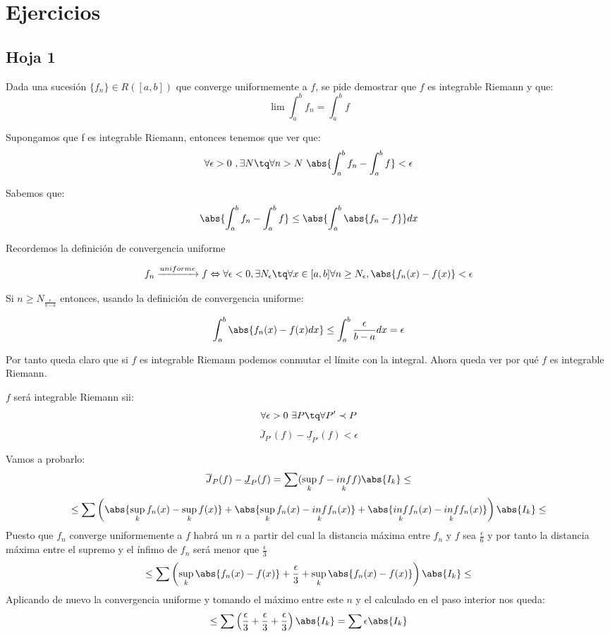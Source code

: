 \section{Ejercicios}
\subsection{Hoja 1}
\begin{problem}[5]
Dada una sucesión $\lbrace f_n \rbrace \in R([a,b])$ que converge uniformemente a $f$, se pide demostrar que $f$ es integrable Riemann y que:
\[ \lim \int_{a}^{b} f_n = \int_{a}^{b} f \]

\solution
Supongamos que f es integrable Riemann, entonces tenemos que ver que:
\[ \forall \epsilon > 0 \ , \exists N \tq \forall n> N \ \abs{\int_a^b f_n - \int_a^b f} < \epsilon\]

Sabemos que:
\[\abs{\int_a^b f_n - \int_a^b f} \leq \abs{\int_a^b \abs{f_n -f}} dx\]

Recordemos la definición de convergencia uniforme

\begin{defn}
\[f_n \xrightarrow{uniforme} f \Leftrightarrow \forall \epsilon < 0, \exists N_{\epsilon} \tq \forall x \in [a,b]  \forall n \geq N_{\epsilon}, \abs{f_n (x) - f(x)} < \epsilon\]
\end{defn}

Si $n \geq N_{\frac{\epsilon}{b-a}}$ entonces, usando la definición de convergencia uniforme:

\[\int_a^b \abs{f_n(x) - f(x) dx} \leq \int_a^b \frac{\epsilon}{b-a}dx = \epsilon\]

Por tanto queda claro que si $f$ es integrable Riemann podemos conmutar el límite con la integral. Ahora queda ver por qué $f$ es integrable Riemann.

$f$ será integrable Riemann sii:
\[\forall \epsilon > 0 \ \exists P \tq \forall P' \prec P \]
\[\overline{J}_{P'}(f) - \underline{J}_{P'}(f) < \epsilon\]

Vamos a probarlo:
\[\overline{J}_P(f) - \underline{J}_P(f) = \sum(\sup_k f - \underset{k}{inf} f)\abs{I_k} \leq\]
\[\leq \sum\left( \abs{\sup_{k}f_n(x) - \sup_{k}f(x)} + \abs{\sup_{k}f_n(x) - \underset{k}{inf}f_n(x)} +  \abs{\underset{k}{inf}f_n(x) - \underset{k}{inf}f_n(x)} \right)\abs{I_k} \leq \]
Puesto que $f_n$ converge uniformemente a $f$ habrá un $n$ a partir del cual la distancia máxima entre $f_n$ y $f$ sea $\frac{\epsilon}{6}$ y por tanto la distancia máxima entre el supremo y el ínfimo de $f_n$ será menor que $\frac{\epsilon}{3}$
\[\leq \sum\left( \sup_{k} \abs{f_n(x) - f(x)} + \frac{\epsilon}{3} + \sup_k \abs{f_n(x) - f(x)} \right)\abs{I_k} \leq\]
Aplicando de nuevo la convergencia uniforme y tomando el máximo entre este $n$ y el calculado en el paso interior nos queda:
\[\leq \sum \left(\frac{\epsilon}{3} + \frac{\epsilon}{3} + \frac{\epsilon}{3} \right)\abs{I_k} = \sum\epsilon\abs{I_k}\]


\end{problem}
